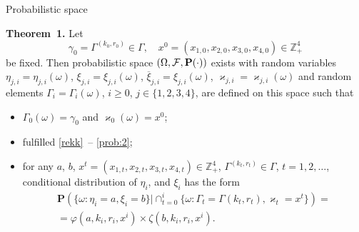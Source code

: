 \documentclass[10pt]{beamer}
\begin{document}
\begin{frame}{Probabilistic space}

\begin{block}{\bf Theorem~1.}
    Let 
    $$\gamma_0=\Gamma^{(k_0,r_0)} \in \Gamma, \quad x^0=(x_{1,0},x_{2,0}, x_{3,0},x_{4,0})\in \mathbb{Z}_+^4$$ be fixed. Then probabilistic space $(\Omega, {\cal F}, {\mathbf P}(\cdot))$ exists with random variables $\eta_{j,i}=\eta_{j,i}(\omega)$, $\xi_{j,i}=\xi_{j,i}(\omega)$, $\overline{\xi}_{j,i}=\xi_{j,i}(\omega)$, $\varkappa_{j,i}=\varkappa_{j,i}(\omega)$ and random elements $\Gamma_i=\Gamma_i(\omega)$, $i\geqslant 0$, $j\in \{1, 2, 3, 4\}$, are defined on this space such that 
    \begin{itemize}
    \item  $\Gamma_0(\omega) = \gamma_0$ and $\varkappa_0(\omega)=x^0$;
    \item fulfilled \eqref{rekk}~-- \eqref{prob:2};
    \item for any $a$, $b$, $x^t=(x_{1,t},x_{2,t},x_{3,t},x_{4,t}) \in \mathbb{Z}_+^4$, $\Gamma^{(k_t,r_t)} \in \Gamma$, $t = 1, 2, \ldots$, conditional distribution of $\eta_i$, and $\xi_i$ has the form
\begin{multline*}
    {\mathbf P}(\{ \omega \colon \eta_i = a, \xi_i=b\} |\cap_{t=0}^{i}\{\omega\colon \Gamma_t=\Gamma{(k_t,r_t)}, \varkappa_t=x^t\})=\\
=\varphi(a,k_i,r_i,x^i)\times \zeta(b,k_i,r_i,x^i).
\end{multline*}
    \end{itemize}

\end{block}
\end{frame}
\end{document}

